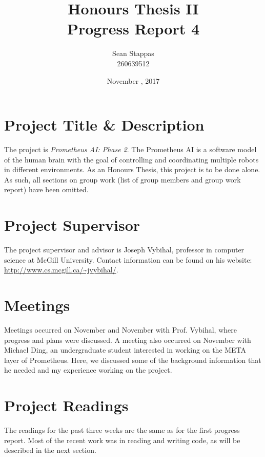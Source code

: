 \documentclass[]{article}
\title{\textbf{Honours Thesis II \\ Progress Report 4}}
\author{Sean Stappas \\ 260639512}
\date{November \nth{15}, 2017}
\begin{document}
	\maketitle
	
	\section{Project Title \& Description}
	
	The project is \emph{Prometheus AI: Phase 2}. The Prometheus AI is a software model of the human brain with the goal of controlling and coordinating multiple robots in different environments. As an Honours Thesis, this project is to be done alone. As such, all sections on group work (list of group members and group work report) have been omitted.
	
	\section{Project Supervisor}
	
	The project supervisor and advisor is Joseph Vybihal, professor in computer science at McGill University. Contact information can be found on his website: \url{http://www.cs.mcgill.ca/~jvybihal/}.
	
	\section{Meetings}
	
	Meetings occurred on November  and November  with Prof. Vybihal, where progress and plans were discussed. A meeting also occurred on November  with Michael Ding, an undergraduate student interested in working on the META layer of Prometheus. Here, we discussed some of the background information that he needed and my experience working on the project.
	
	\section{Project Readings} \label{sec:readings}
	
	The readings for the past three weeks are the same as for the first progress report. Most of the recent work was in reading and writing code, as will be described in the next section.
	
\end{document}
